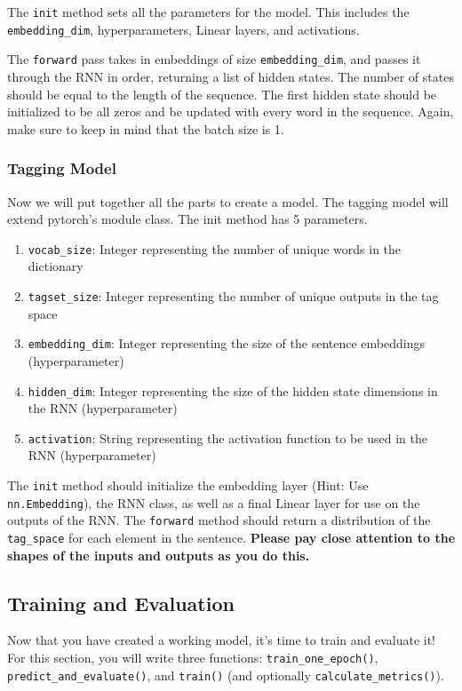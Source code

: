 \documentclass[11pt,addpoints,answers]{exam}
\begin{document}
The \texttt{init} method sets all the parameters for the model. This includes the \texttt{embedding\_dim}, hyperparameters, Linear layers, and activations. 

The \texttt{forward} pass takes in embeddings of size \texttt{embedding\_dim}, and passes it through the RNN in order, returning a list of hidden states. The number of states should be equal to the length of the sequence. The first hidden state should be initialized to be all zeros and be updated with every word in the sequence. Again, make sure to keep in mind that the batch size is 1.

\subsubsection{Tagging Model}\label{model}
Now we will put together all the parts to create a model. The tagging model will extend pytorch's module class. The init method has 5 parameters.

\begin{enumerate}
    \item \texttt{vocab\_size}: Integer representing the number of unique words in the dictionary
    \item \texttt{tagset\_size}: Integer representing the number of unique outputs in the tag space
    \item \texttt{embedding\_dim}: Integer representing the size of the sentence embeddings (hyperparameter)
    \item \texttt{hidden\_dim}: Integer representing the size of the hidden state dimensions in the RNN (hyperparameter)
    \item \texttt{activation}: String representing the activation function to be used in the RNN (hyperparameter)
\end{enumerate}
The \texttt{init} method should initialize the embedding layer (Hint: Use \texttt{nn.Embedding}), the RNN class, as well as a final Linear layer for use on the outputs of the RNN. The \texttt{forward} method should return a distribution of the \texttt{tag\_space} for each element in the sentence. \textbf{Please pay close attention to the shapes of the inputs and outputs as you do this.} 

\subsection{Training and Evaluation}\label{train_and_eval}

Now that you have created a working model, it's time to train and evaluate it! For this section, you will write three functions: \texttt{train\_one\_epoch()},  \texttt{predict\_and\_evaluate()}, and \texttt{train()} (and optionally \texttt{calculate\_metrics()}).
\end{document}
